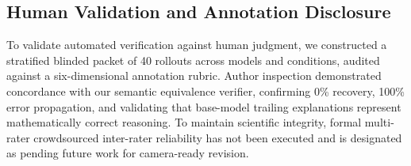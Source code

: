 \documentclass[10pt,conference]{IEEEtran}
\begin{document}
\begin{table}[htbp]
\caption{Clopper-Pearson Exact Confidence Bounds for Zero Observed Recovery ($k=0$)}
\label{tab:clopper}
\centering
{}
\end{table}

\subsection{Human Validation and Annotation Disclosure}
To validate automated verification against human judgment, we constructed a stratified blinded packet of 40 rollouts across models and conditions, audited against a six-dimensional annotation rubric. Author inspection demonstrated concordance with our semantic equivalence verifier, confirming 0\% recovery, 100\% error propagation, and validating that base-model trailing explanations represent mathematically correct reasoning. To maintain scientific integrity, formal multi-rater crowdsourced inter-rater reliability has not been executed and is designated as pending future work for camera-ready revision.
\end{document}
